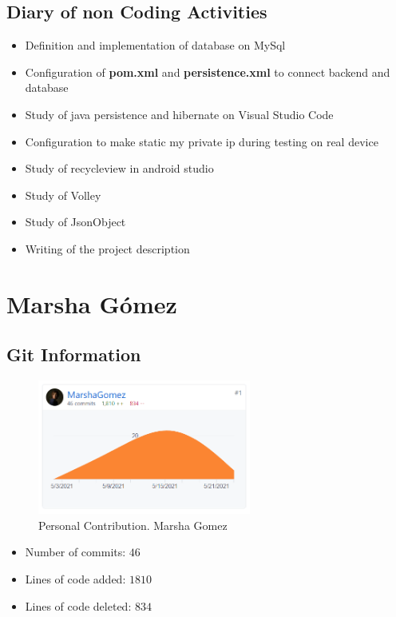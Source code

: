 \documentclass{article}
\begin{document}
\subsection{Diary of non Coding Activities}

\begin{itemize}
    \item Definition and implementation of database on MySql
    \item Configuration of \textbf{pom.xml} and \textbf{persistence.xml} to connect backend and database
    \item Study of java persistence and hibernate on Visual Studio Code
    \item Configuration to make static my private ip during testing on real device
    \item Study of recycleview in android studio
    \item Study of Volley
    \item Study of JsonObject
    \item Writing of the project description
\end{itemize}

\section{Marsha Gómez}

\subsection{Git Information}

\begin{figure}[h!]
\centering
\includegraphics[width=7cm]{img/mg.PNG}
\caption{Personal Contribution. Marsha Gomez}
\label{fig:universe}
\end{figure}

\begin{itemize}
    \item Number of commits: \(46\)
    \item Lines of code added: \(1810\)
    \item Lines of code deleted: \(834\)
\end{itemize}
\end{document}
